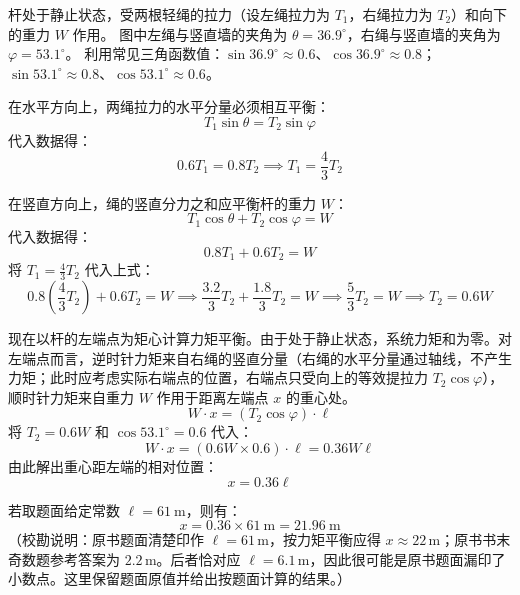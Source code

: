 \begin{solution}
杆处于静止状态，受两根轻绳的拉力（设左绳拉力为 $T_1$，右绳拉力为 $T_2$）和向下的重力 $W$ 作用。
图中左绳与竖直墙的夹角为 $\theta = 36.9^\circ$，右绳与竖直墙的夹角为 $\varphi = 53.1^\circ$。
利用常见三角函数值：$\sin 36.9^\circ \approx 0.6$、$\cos 36.9^\circ \approx 0.8$；$\sin 53.1^\circ \approx 0.8$、$\cos 53.1^\circ \approx 0.6$。

在水平方向上，两绳拉力的水平分量必须相互平衡：
$$ T_1 \sin\theta = T_2 \sin\varphi $$
代入数据得：
$$ 0.6 T_1 = 0.8 T_2 \implies T_1 = \frac{4}{3} T_2 $$

在竖直方向上，绳的竖直分力之和应平衡杆的重力 $W$：
$$ T_1 \cos\theta + T_2 \cos\varphi = W $$
代入数据得：
$$ 0.8 T_1 + 0.6 T_2 = W $$
将 $T_1 = \frac{4}{3} T_2$ 代入上式：
$$ 0.8 \left( \frac{4}{3} T_2 \right) + 0.6 T_2 = W \implies \frac{3.2}{3} T_2 + \frac{1.8}{3} T_2 = W \implies \frac{5}{3} T_2 = W \implies T_2 = 0.6 W $$

现在以杆的左端点为矩心计算力矩平衡。由于处于静止状态，系统力矩和为零。对左端点而言，逆时针力矩来自右绳的竖直分量（右绳的水平分量通过轴线，不产生力矩；此时应考虑实际右端点的位置，右端点只受向上的等效提拉力 $T_2\cos\varphi$），顺时针力矩来自重力 $W$ 作用于距离左端点 $x$ 的重心处。
$$ W \cdot x = (T_2 \cos\varphi) \cdot \ell $$
将 $T_2 = 0.6 W$ 和 $\cos 53.1^\circ = 0.6$ 代入：
$$ W \cdot x = (0.6 W \times 0.6) \cdot \ell = 0.36 W \ell $$
由此解出重心距左端的相对位置：
$$ x = 0.36 \ell $$

若取题面给定常数 $\ell = 61 \ \mathrm{m}$，则有：
$$ x = 0.36 \times 61 \ \mathrm{m} = 21.96 \ \mathrm{m} $$
（校勘说明：原书题面清楚印作 $\ell=61\,\mathrm{m}$，按力矩平衡应得 $x\approx22\,\mathrm{m}$；原书书末奇数题参考答案为 $2.2\,\mathrm{m}$。后者恰对应 $\ell=6.1\,\mathrm{m}$，因此很可能是原书题面漏印了小数点。这里保留题面原值并给出按题面计算的结果。）
\end{solution}

